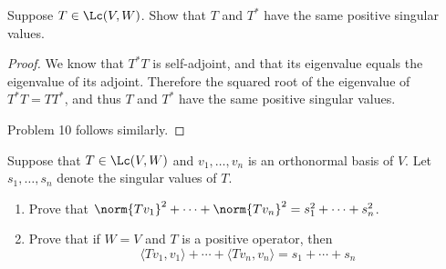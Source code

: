 \documentclass{extarticle}
\begin{document}



\begin{problem}{9}
    Suppose \(T \in \Lc(V, W)\). Show that \(T\) and \(T^*\) have the same positive singular
    values.
\end{problem}

\begin{proof}
We know that \(T^*T\) is self-adjoint, and that its eigenvalue equals the eigenvalue of its adjoint.
Therefore the squared root of the eigenvalue of \(T^*T = TT^*\), and thus \(T\) and \(T^*\) have
the same positive singular values.

Problem 10 follows similarly.
\end{proof}

\begin{problem}{11}
    Suppose that \(T \in \Lc(V, W)\) and \(v_1, \ldots, v_n\) is an orthonormal basis of \(V\).
    Let \(s_1, \ldots, s_n\) denote the singular values of \(T\).
    \begin{enumerate}[label=(\alph*)]
        \item Prove that \(\norm{Tv_1}^2 + \cdots + \norm{Tv_n}^2 = s_1^2 + \cdots + s_n^2\).
        \item Prove that if \(W = V\) and \(T\) is a positive operator, then
        \[\langle Tv_1,v_1 \rangle + \cdots + \langle Tv_n,v_n \rangle = s_1 + \cdots + s_n\]
    \end{enumerate}
\end{problem}
\end{document}

